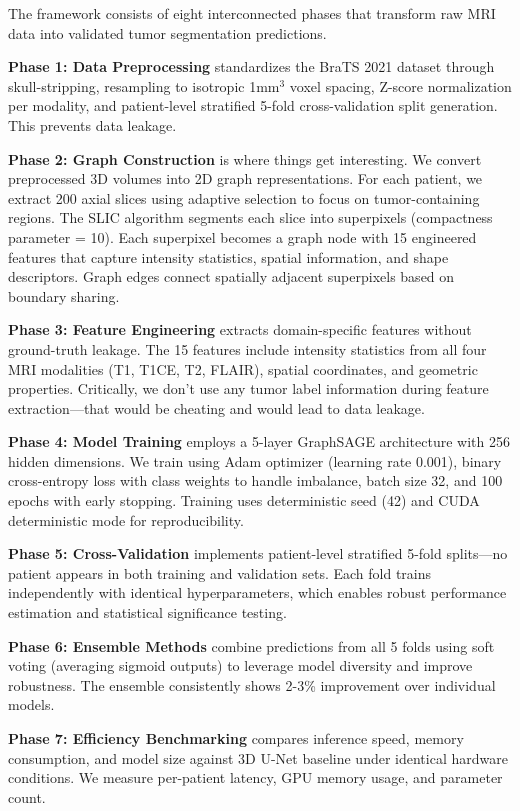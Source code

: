 The framework consists of eight interconnected phases that transform raw MRI data into validated tumor segmentation predictions.

\textbf{Phase 1: Data Preprocessing} standardizes the BraTS 2021 dataset through skull-stripping, resampling to isotropic 1mm$^3$ voxel spacing, Z-score normalization per modality, and patient-level stratified 5-fold cross-validation split generation. This prevents data leakage.

\textbf{Phase 2: Graph Construction} is where things get interesting. We convert preprocessed 3D volumes into 2D graph representations. For each patient, we extract 200 axial slices using adaptive selection to focus on tumor-containing regions. The SLIC algorithm segments each slice into superpixels (compactness parameter = 10). Each superpixel becomes a graph node with 15 engineered features that capture intensity statistics, spatial information, and shape descriptors. Graph edges connect spatially adjacent superpixels based on boundary sharing.

\textbf{Phase 3: Feature Engineering} extracts domain-specific features without ground-truth leakage. The 15 features include intensity statistics from all four MRI modalities (T1, T1CE, T2, FLAIR), spatial coordinates, and geometric properties. Critically, we don't use any tumor label information during feature extraction—that would be cheating and would lead to data leakage.

\textbf{Phase 4: Model Training} employs a 5-layer GraphSAGE architecture with 256 hidden dimensions. We train using Adam optimizer (learning rate 0.001), binary cross-entropy loss with class weights to handle imbalance, batch size 32, and 100 epochs with early stopping. Training uses deterministic seed (42) and CUDA deterministic mode for reproducibility.

\textbf{Phase 5: Cross-Validation} implements patient-level stratified 5-fold splits—no patient appears in both training and validation sets. Each fold trains independently with identical hyperparameters, which enables robust performance estimation and statistical significance testing.

\textbf{Phase 6: Ensemble Methods} combine predictions from all 5 folds using soft voting (averaging sigmoid outputs) to leverage model diversity and improve robustness. The ensemble consistently shows 2-3\% improvement over individual models.

\textbf{Phase 7: Efficiency Benchmarking} compares inference speed, memory consumption, and model size against 3D U-Net baseline under identical hardware conditions. We measure per-patient latency, GPU memory usage, and parameter count.

